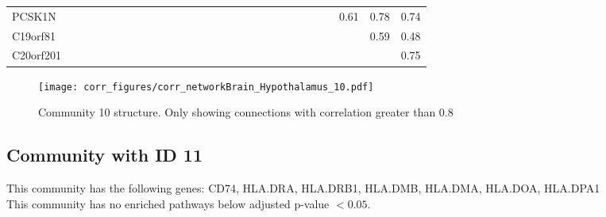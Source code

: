 \begin{longtable}{lrrrrrrrrrrrrrrrrrrrrrrrrrrr}
PCSK1N        &               &            &             &              &            &               &             &               &              &             &              &             &             &               &                     &              &                &                  &             &                &               &              &            &              &           0.61 &            0.78 &          0.74 \\
C19orf81      &               &            &             &              &            &               &             &               &              &             &              &             &             &               &                     &              &                &                  &             &                &               &              &            &              &                &            0.59 &          0.48 \\
C20orf201     &               &            &             &              &            &               &             &               &              &             &              &             &             &               &                     &              &                &                  &             &                &               &              &            &              &                &                 &          0.75 \\
\end{longtable}


\begin{figure}[h!]
\centering
\texttt{[image: corr\_figures/corr\_networkBrain\_Hypothalamus\_10.pdf]}
\caption{Community 10 structure. Only showing connections with correlation greater than 0.8}
\end{figure}




\subsection*{Community with ID 11}
This community has the following genes: CD74, HLA.DRA, HLA.DRB1, HLA.DMB, HLA.DMA, HLA.DOA, HLA.DPA1
\\
This community has no enriched pathways below adjusted p-value $< 0.05$.

